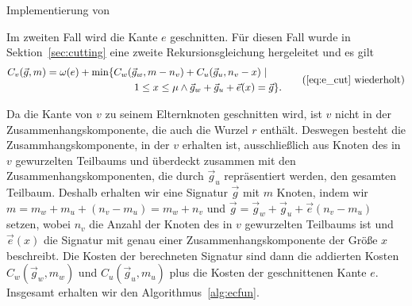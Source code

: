 \begin{algorithm}
    \caption{Implementierung von }\label{alg:encfun}
    \begin{algorithmic}[1]
            \label{alg:encfun:line:assign}
        \EndFunction
    \end{algorithmic}
\end{algorithm}

Im zweiten Fall wird die Kante $e$ geschnitten.
Für diesen Fall wurde in Sektion~\ref{sec:cutting} eine zweite Rekursionsgleichung hergeleitet und es gilt
\begin{equation*}
    \begin{aligned}
        C_v(\vec{g}, m) = \weight(e) + \min \{ & C_w(\vec{g}_w, m - n_v) + C_u(\vec{g}_u, n_v - x) \mid \\ & \qquad 1 \leq x \leq \mu \land \vec{g}_w + \vec{g}_u + \vec{e}(x) = \vec{g} \}. 
    \end{aligned}
    \tag{\ref{eq:e_cut} wiederholt}
\end{equation*}

Da die Kante von $v$ zu seinem Elternknoten geschnitten wird, ist $v$ nicht in der Zusammenhangskomponente, die auch die Wurzel $r$ enthält.
Deswegen besteht die Zusammhangskomponente, in der $v$ erhalten ist, ausschließlich aus Knoten des in $v$ gewurzelten Teilbaums und überdeckt zusammen mit den Zusammenhangskomponenten, die durch $\vec{g}_u$ repräsentiert werden, den gesamten Teilbaum.
Deshalb erhalten wir eine Signatur $\vec{g}$ mit $m$ Knoten, indem wir $m = m_w + m_u + (n_v - m_u) = m_w + n_v$ und $\vec{g} = \vec{g}_w + \vec{g}_u + \vec{e}(n_v - m_u)$ setzen, wobei $n_v$ die Anzahl der Knoten des in $v$ gewurzelten Teilbaums ist und $\vec{e}(x)$ die Signatur mit genau einer Zusammenhangskomponente der Größe $x$ beschreibt.
Die Kosten der berechneten Signatur sind dann die addierten Kosten $C_w(\vec{g}_w, m_w)$ und $C_u(\vec{g}_u, m_u)$ plus die Kosten der geschnittenen Kante $e$. 
Insgesamt erhalten wir den Algorithmus~\ref{alg:ecfun}.

